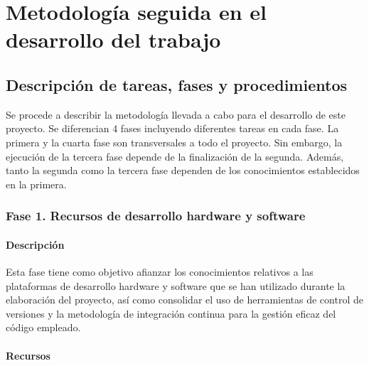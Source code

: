 
\chapter{Metodología seguida en el desarrollo del trabajo} %

\label{Metodología} %

\section{Descripción de tareas, fases y procedimientos}

Se procede a describir la metodología llevada a cabo para el desarrollo de este proyecto.
Se diferencian 4 fases incluyendo diferentes tareas en cada fase.
La primera y la cuarta fase son transversales a todo el proyecto.
Sin embargo, la ejecución de la tercera fase depende de la finalización de la segunda.
Además, tanto la segunda como la tercera fase dependen de los conocimientos establecidos en la primera.

\subsection{Fase 1. Recursos de desarrollo hardware y software}

\subsubsection{Descripción}

Esta fase tiene como objetivo afianzar los conocimientos relativos a las plataformas de desarrollo hardware y software que se han utilizado durante la elaboración del proyecto, así como consolidar el uso de herramientas de control de versiones y la metodología de integración continua para la gestión eficaz del código empleado.

\subsubsection{Recursos}

\label{recurs}

